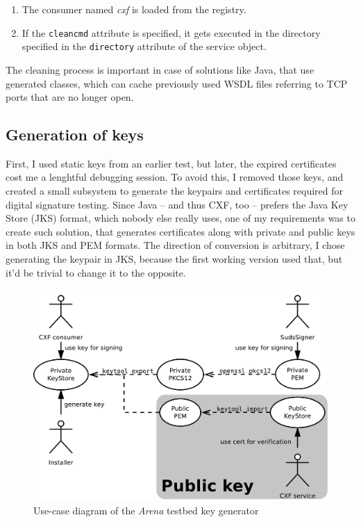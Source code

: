 \begin{enumerate}
 \item The consumer named \emph{cxf} is loaded from the registry.
 \item If the \verb|cleancmd| attribute is specified, it gets executed in the directory specified in the \verb|directory| attribute of the service object.
\end{enumerate}

The cleaning process is important in case of solutions like Java, that use generated classes, which can cache previously used WSDL files referring to TCP ports that are no longer open.

\subsection{Generation of keys}

First, I used static keys from an earlier test, but later, the expired certificates cost me a lenghtful debugging session. To avoid this, I removed those keys, and created a small subsystem to generate the keypairs and certificates required for digital signature testing. Since Java -- and thus CXF, too -- prefers the Java Key Store (JKS) format, which nobody else really uses, one of my requirements was to create such solution, that generates certificates along with private and public keys in both JKS and PEM formats. The direction of conversion is arbitrary, I chose generating the keypair in JKS, because the first working version used that, but it'd be trivial to change it to the opposite.

\begin{figure}[htbp]
 \centering
 \includegraphics[width=14cm]{images/ucdArenaKeys.pdf}
 \caption{Use-case diagram of the \emph{Arena} testbed key generator}
 \label{fig:ucdArenaKeys}
\end{figure}

